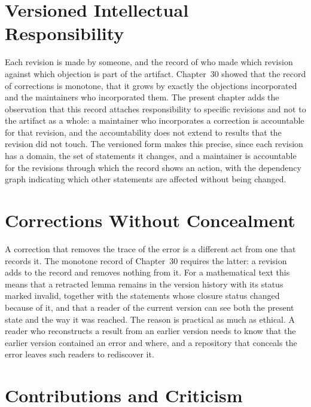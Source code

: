 \documentclass[11pt,letterpaper]{report}
\theoremstyle{plain}
\theoremstyle{definition}
\theoremstyle{remark}
\begin{document}
\section{Versioned Intellectual Responsibility}

Each revision is made by someone, and the record of who made which revision against which objection is part of the artifact. Chapter~30 showed that the record of corrections is monotone, that it grows by exactly the objections incorporated and the maintainers who incorporated them. The present chapter adds the observation that this record attaches responsibility to specific revisions and not to the artifact as a whole: a maintainer who incorporates a correction is accountable for that revision, and the accountability does not extend to results that the revision did not touch. The versioned form makes this precise, since each revision has a domain, the set of statements it changes, and a maintainer is accountable for the revisions through which the record shows an action, with the dependency graph indicating which other statements are affected without being changed.

\section{Corrections Without Concealment}

A correction that removes the trace of the error is a different act from one that records it. The monotone record of Chapter~30 requires the latter: a revision adds to the record and removes nothing from it. For a mathematical text this means that a retracted lemma remains in the version history with its status marked invalid, together with the statements whose closure status changed because of it, and that a reader of the current version can see both the present state and the way it was reached. The reason is practical as much as ethical. A reader who reconstructs a result from an earlier version needs to know that the earlier version contained an error and where, and a repository that conceals the error leaves such readers to rediscover it.

\section{Contributions and Criticism}
\end{document}
